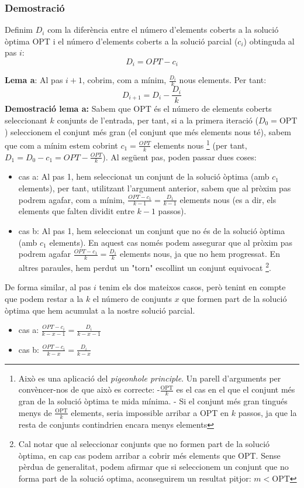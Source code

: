 \documentclass{article}
\begin{document}
\subsubsection{Demostració}
Definim $D_i$ com la diferència entre el número d'elements coberts a la solució òptima OPT i el número d'elements coberts a la solució parcial ($c_i$) obtinguda al pas $i$:
\[
D_i = OPT-c_i
\]
\par
\textbf{Lema a}: Al pas $i+1$, cobrim, com a mínim, $\frac{D_i}{k}$ nous elements. Per tant:
\[
D_{i+1} = D_i - \frac{D_i}{k}
\]
\textbf{Demostració lema a:}
\newline
Sabem que OPT és el número de elements coberts seleccionant $k$ conjunts de l'entrada, per tant, si a la primera iteració ($D_0=\text{OPT}$) seleccionem el conjunt més gran (el conjunt que més elements nous té), sabem que com a mínim estem cobrint $c_1=\frac{OPT}{k}$ elements nous 
\footnote{Això es una aplicació del \textit{pigeonhole principle}. Un parell d'arguments per convèncer-nos de que això es correcte: \newline -$\frac{\text{OPT}}{k}$ es el cas en el que el conjunt més gran de la solució òptima te mida mínima. \newline - Si el conjunt més gran tingués menys de $\frac{\text{OPT}}{k}$ elements, seria impossible arribar a OPT en $k$ passos, ja que la resta de conjunts contindrien encara menys elements\newline} (per tant, $D_1=D_0-c_1=OPT-\frac{OPT}{k}$).
\newline
Al següent pas, poden passar dues coses:
\begin{itemize}
    \item cas a: Al pas 1, hem seleccionat un conjunt de la solució òptima (amb $c_1$ elements), per tant, utilitzant l'argument anterior, sabem que al pròxim pas podrem agafar, com a mínim, $\frac{OPT-c_1}{k-1}=\frac{D_1}{k-1}$ elements nous (es a dir, els elements que falten dividit entre $k-1$ passos).
    \item cas b: Al pas 1, hem seleccionat un conjunt que no és de la solució òptima (amb $c_1$ elements). En aquest cas només podem assegurar que al pròxim pas podrem agafar $\frac{OPT-c_1}{k}=\frac{D_1}{k}$ elements nous, ja que no hem progressat. En altres paraules, hem perdut un "torn" escollint un conjunt equivocat    \footnote{Cal notar que al seleccionar conjunts que no formen part de la solució òptima, en cap cas podem arribar a cobrir més elements que OPT. Sense pèrdua de generalitat, podem afirmar que si seleccionem un conjunt que no forma part de la solució optima, aconseguirem un resultat pitjor: $m < \text{OPT}$}.
\end{itemize}
De forma similar, al pas $i$ tenim els dos mateixos casos, però tenint en compte que podem restar a la $k$ el número de conjunts $x$ que formen part de la solució òptima que hem acumulat a la nostre solució parcial.
\begin{itemize}
    \item cas a: $\frac{OPT-c_i}{k-x-1}=\frac{D_i}{k-x-1}$
    \item cas b: $\frac{OPT-c_i}{k-x}=\frac{D_i}{k-x}$
\end{itemize}
\end{document}
